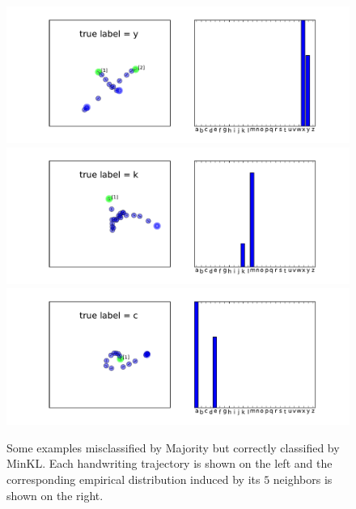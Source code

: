 \documentclass{article}
\begin{document}
\begin{figure}[htb]
\vskip 0.2in
\begin{center}
\centering
  \includegraphics[width=.95\linewidth]{figures/icml-uright-interesting-134.pdf}\\
  \includegraphics[width=.95\linewidth]{figures/icml-uright-interesting-70.pdf}\\
  \includegraphics[width=.95\linewidth]{figures/icml-uright-interesting-248.pdf}\\
  \caption{Some examples misclassified by Majority but correctly
    classified by MinKL. Each handwriting trajectory is shown on the
    left and the corresponding empirical distribution induced by its
    $5$ neighbors is shown on the right.}
  \label{fig:uright-mistakes}
\end{center}
\vskip -0.2in
\end{figure}
\end{document}
